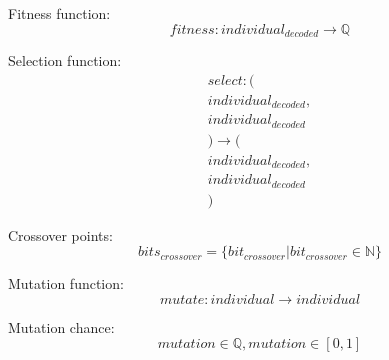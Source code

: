 \documentclass[conference]{IEEEtran}
\begin{document}
Fitness function:
\begin{equation} fitness : individual_{decoded} \rightarrow \mathbb{Q} \end{equation}

Selection function:
\begin{multline} select : (\\individual_{decoded}, \\individual_{decoded}\\) \rightarrow (\\individual_{decoded}, \\individual_{decoded}\\) \end{multline}

Crossover points:
\begin{equation} bits_{crossover} = \{bit_{crossover} | bit_{crossover} \in \mathbb{N}\} \end{equation}

Mutation function:
\begin{equation} mutate : individual \rightarrow individual \end{equation}

Mutation chance:
\begin{equation} mutation \in \mathbb{Q}, mutation \in [0, 1] \end{equation}
\end{document}

